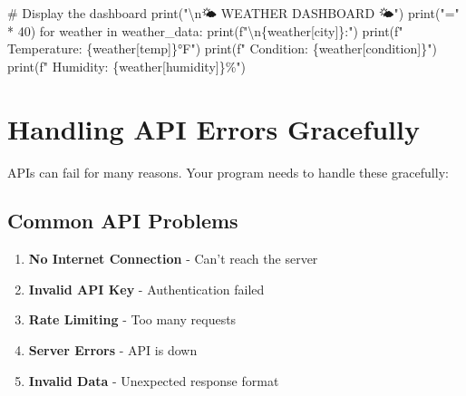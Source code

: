 \documentclass[
  letterpaper,
  DIV=11,
  numbers=noendperiod,
  oneside]{scrreprt}
\newenvironment{Shaded}{}{}
\newcommand{\BuiltInTok}[1]{\textcolor[rgb]{0.84,0.23,0.29}{#1}}
\newcommand{\CharTok}[1]{\textcolor[rgb]{0.01,0.18,0.38}{#1}}
\newcommand{\CommentTok}[1]{\textcolor[rgb]{0.42,0.45,0.49}{#1}}
\newcommand{\ControlFlowTok}[1]{\textcolor[rgb]{0.84,0.23,0.29}{#1}}
\newcommand{\DecValTok}[1]{\textcolor[rgb]{0.00,0.36,0.77}{#1}}
\newcommand{\KeywordTok}[1]{\textcolor[rgb]{0.84,0.23,0.29}{#1}}
\newcommand{\NormalTok}[1]{\textcolor[rgb]{0.14,0.16,0.18}{#1}}
\newcommand{\OperatorTok}[1]{\textcolor[rgb]{0.14,0.16,0.18}{#1}}
\newcommand{\SpecialCharTok}[1]{\textcolor[rgb]{0.00,0.36,0.77}{#1}}
\newcommand{\SpecialStringTok}[1]{\textcolor[rgb]{0.01,0.18,0.38}{#1}}
\newcommand{\StringTok}[1]{\textcolor[rgb]{0.01,0.18,0.38}{#1}}
\providecommand{\tightlist}{%
  \setlength{\itemsep}{0pt}\setlength{\parskip}{0pt}}\usepackage{longtable,booktabs,array}
\begin{document}
\begin{Shaded}
\begin{Highlighting}[]
    \CommentTok{\# Display the dashboard}
    \BuiltInTok{print}\NormalTok{(}\StringTok{"}\CharTok{\textbackslash{}n}\StringTok{🌤️  WEATHER DASHBOARD  🌤️"}\NormalTok{)}
    \BuiltInTok{print}\NormalTok{(}\StringTok{"="} \OperatorTok{*} \DecValTok{40}\NormalTok{)}
    \ControlFlowTok{for}\NormalTok{ weather }\KeywordTok{in}\NormalTok{ weather\_data:}
        \BuiltInTok{print}\NormalTok{(}\SpecialStringTok{f"}\CharTok{\textbackslash{}n}\SpecialCharTok{\{}\NormalTok{weather[}\StringTok{\textquotesingle{}city\textquotesingle{}}\NormalTok{]}\SpecialCharTok{\}}\SpecialStringTok{:"}\NormalTok{)}
        \BuiltInTok{print}\NormalTok{(}\SpecialStringTok{f"  Temperature: }\SpecialCharTok{\{}\NormalTok{weather[}\StringTok{\textquotesingle{}temp\textquotesingle{}}\NormalTok{]}\SpecialCharTok{\}}\SpecialStringTok{°F"}\NormalTok{)}
        \BuiltInTok{print}\NormalTok{(}\SpecialStringTok{f"  Condition: }\SpecialCharTok{\{}\NormalTok{weather[}\StringTok{\textquotesingle{}condition\textquotesingle{}}\NormalTok{]}\SpecialCharTok{\}}\SpecialStringTok{"}\NormalTok{)}
        \BuiltInTok{print}\NormalTok{(}\SpecialStringTok{f"  Humidity: }\SpecialCharTok{\{}\NormalTok{weather[}\StringTok{\textquotesingle{}humidity\textquotesingle{}}\NormalTok{]}\SpecialCharTok{\}}\SpecialStringTok{\%"}\NormalTok{)}
\end{Highlighting}
\end{Shaded}

\section{Handling API Errors
Gracefully}\label{handling-api-errors-gracefully}

APIs can fail for many reasons. Your program needs to handle these
gracefully:

\subsection{Common API Problems}\label{common-api-problems}

\begin{enumerate}
\def\labelenumi{\arabic{enumi}.}
\tightlist
\item
  \textbf{No Internet Connection} - Can't reach the server
\item
  \textbf{Invalid API Key} - Authentication failed
\item
  \textbf{Rate Limiting} - Too many requests
\item
  \textbf{Server Errors} - API is down
\item
  \textbf{Invalid Data} - Unexpected response format
\end{enumerate}
\end{document}
